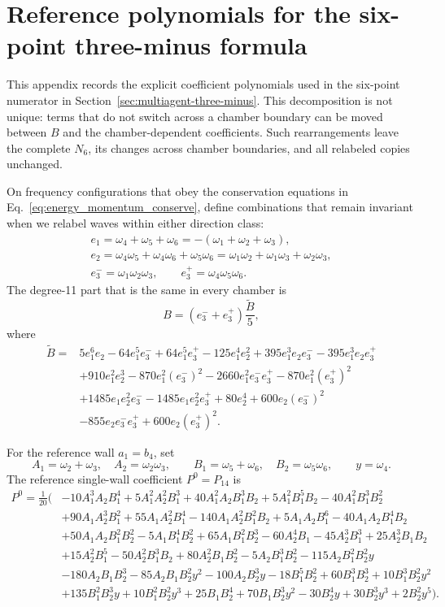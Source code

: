 \documentclass{article}
\begin{document}
\section{Reference polynomials for the six-point three-minus formula}
\label{app:a6-reference-polynomials}

This appendix records the explicit coefficient polynomials used in the
six-point numerator in Section~\ref{sec:multiagent-three-minus}. This
decomposition is not unique: terms that do not switch across a chamber boundary can be
moved between $B$ and the chamber-dependent coefficients. Such rearrangements leave the
complete $N_6$, its changes across chamber boundaries, and all relabeled copies
unchanged.

On frequency configurations that obey the conservation equations in
Eq.~\eqref{eq:energy_momentum_conserve}, define combinations that remain
invariant when we relabel waves within either direction class:
\[
\begin{gathered}
e_1=\omega_4+\omega_5+\omega_6
=-(\omega_1+\omega_2+\omega_3),\\
e_2=\omega_4\omega_5+\omega_4\omega_6+\omega_5\omega_6
=\omega_1\omega_2+\omega_1\omega_3+\omega_2\omega_3,\\
e_3^-=\omega_1\omega_2\omega_3,\qquad
e_3^+=\omega_4\omega_5\omega_6.
\end{gathered}
\]
The degree-11 part that is the same in every chamber is
\[
B=(e_3^-+e_3^+)\frac{\widetilde B}{5},
\]
where
\[
\begin{aligned}
\widetilde B={}&
5e_1^{6}e_2-64e_1^{5}e_3^-+64e_1^{5}e_3^+
-125e_1^{4}e_2^{2}
+395e_1^{3}e_2e_3^--395e_1^{3}e_2e_3^+\\
&+910e_1^{2}e_2^{3}-870e_1^{2}(e_3^-)^{2}
-2660e_1^{2}e_3^-e_3^+-870e_1^{2}(e_3^+)^{2}\\
&+1485e_1e_2^{2}e_3^--1485e_1e_2^{2}e_3^+
+80e_2^{4}+600e_2(e_3^-)^{2}\\
&-855e_2e_3^-e_3^++600e_2(e_3^+)^{2}.
\end{aligned}
\]

For the reference wall $a_1=b_4$, set
\[
A_1=\omega_2+\omega_3,\quad A_2=\omega_2\omega_3,\qquad
B_1=\omega_5+\omega_6,\quad B_2=\omega_5\omega_6,\qquad
y=\omega_4.
\]
The reference single-wall coefficient $P^0=P_{14}$ is
\[
\begin{aligned}
P^0=\frac{1}{20}\Big(&
-10A_1^{3}A_2B_1^{4}+5A_1^{2}A_2^{2}B_1^{3}
+40A_1^{2}A_2B_1^{3}B_2+5A_1^{2}B_1^{5}B_2
-40A_1^{2}B_1^{3}B_2^{2}\\
&+90A_1A_2^{3}B_1^{2}+55A_1A_2^{2}B_1^{4}
-140A_1A_2^{2}B_1^{2}B_2+5A_1A_2B_1^{6}
-40A_1A_2B_1^{4}B_2\\
&+50A_1A_2B_1^{2}B_2^{2}-5A_1B_1^{4}B_2^{2}
+65A_1B_1^{2}B_2^{3}-60A_2^{4}B_1
-45A_2^{3}B_1^{3}+25A_2^{3}B_1B_2\\
&+15A_2^{2}B_1^{5}-50A_2^{2}B_1^{3}B_2
+80A_2^{2}B_1B_2^{2}-5A_2B_1^{3}B_2^{2}
-115A_2B_1^{2}B_2^{2}y\\
&-180A_2B_1B_2^{3}-85A_2B_1B_2^{2}y^{2}
-100A_2B_2^{3}y-18B_1^{5}B_2^{2}
+60B_1^{3}B_2^{3}+10B_1^{3}B_2^{2}y^{2}\\
&+135B_1^{2}B_2^{3}y+10B_1^{2}B_2^{2}y^{3}
+25B_1B_2^{4}+70B_1B_2^{3}y^{2}
-30B_2^{4}y+30B_2^{3}y^{3}+2B_2^{2}y^{5}
\Big).
\end{aligned}
\]
\end{document}
